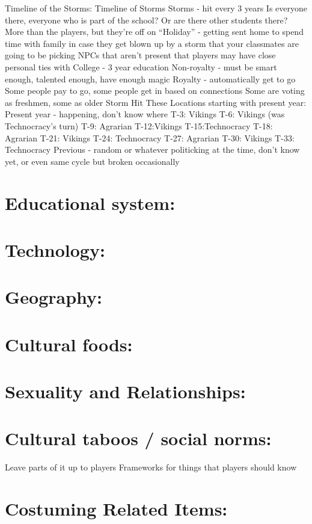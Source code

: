 \documentclass[blue]{GL2020}
\begin{document}
Timeline of the Storms:
Timeline of Storms
Storms - hit every 3 years
Is everyone there, everyone who is part of the school?  Or are there other students there?
More than the players, but they’re off on “Holiday” - getting sent home to spend time with family in case they get blown up by a storm that your classmates are going to be picking
NPCs that aren’t present that players may have close personal ties with
College - 3 year education
Non-royalty - must be smart enough, talented enough, have enough magic
Royalty - automatically get to go
Some people pay to go, some people get in based on connections
Some are voting as freshmen, some as older
Storm Hit These Locations starting with present year:
Present year - happening, don’t know where
T-3: Vikings
T-6: Vikings (was Technocracy’s turn)
T-9: Agrarian
T-12:Vikings
T-15:Technocracy
T-18: Agrarian
T-21: Vikings
T-24: Technocracy
T-27: Agrarian
T-30: Vikings
T-33: Technocracy
Previous - random or whatever politicking at the time, don’t know yet, or even same cycle but broken occasionally

\section{Educational system:}

\section{Technology:}

\section{Geography:}

\section{Cultural foods:}

\section{Sexuality and Relationships:}

\section{Cultural taboos / social norms:}

Leave parts of it up to players
Frameworks for things that players should know

\section{Costuming Related Items:}
\end{document}
